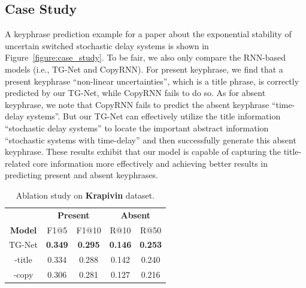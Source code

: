 \documentclass[letterpaper]{article} %
\begin{document}
\subsection{Case Study}
\vspace{-1.81mm}
\vspace{-0.72mm}
A keyphrase prediction example for a paper about the exponential stability of uncertain switched stochastic delay systems is shown in Figure~\ref{figure:case_study}. To be fair, we also only compare the RNN-based models (i.e., TG-Net and CopyRNN). For present keyphrase, we find that a present keyphrase ``non-linear uncertainties'', which is a title phrase, is correctly predicted by our TG-Net, while CopyRNN fails to do so. As for absent keyphrase, we note that CopyRNN fails to predict the absent keyphrase ``time-delay systems''. But our TG-Net can effectively utilize the title information ``stochastic delay systems'' to locate the important abstract information ``stochastic systems with time-delay'' and then successfully generate this absent keyphrase. These results exhibit that our model is capable of capturing the title-related core information more effectively and achieving better results in predicting present and absent keyphrases.


\begin{table}[t]
\centering
\begin{tabular}{c| c c| c c}
\hline
\hline
& \multicolumn{2}{c|}{\textbf{Present}} & \multicolumn{2}{c}{\textbf{Absent}}
\\
\textbf{Model} & F1@5 & F1@10 & R@10 & R@50
\\
\hline
\hline
TG-Net & \textbf{0.349} & \textbf{0.295} & \textbf{0.146} & \textbf{0.253}\\
\hline
-title & 0.334 & 0.288 & 0.142 & 0.240\\
\hline
-copy & 0.306 & 0.281 & 0.127 & 0.216\\
\hline
\end{tabular}
\vspace{-0.72mm}
\caption{Ablation study on \textbf{Krapivin} dataset.}
\label{table:ablation study}
\end{table}
\end{document}
